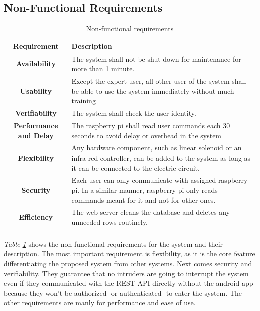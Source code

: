 \documentclass[12pt]{paper}
\begin{document}
		\subsection{Non-Functional Requirements}
		\def\arraystretch{1.5}
		\begin{table}[H]
			\begin{center}
				\begin{tabularx}{\linewidth}{|c|X|}\hline
					\textbf{Requirement} & \textbf{Description}\\\hline
					\textbf{Availability} & The system shall not be shut down for maintenance for more than 1 minute. \\\hline
					\textbf{Usability} & Except the expert user, all other user of the system shall be able to use the system immediately without much training  \\\hline
					\textbf{Verifiability} & The system shall check the user identity. \\\hline
					\textbf{Performance and Delay} & The raspberry pi shall read user commands each 30 seconds to avoid delay or overhead in the system\\\hline
					\textbf{Flexibility} & Any hardware component, such as linear solenoid or an infra-red controller, can be added to the system as long as it can be connected to the electric circuit.  \\\hline
					\textbf{Security} & Each user can only communicate with assigned raspberry pi. In a similar manner, raspberry pi only reads commands meant for it and not for other ones.  \\\hline
					\textbf{Efficiency} & The web server cleans the database and deletes any unneeded rows routinely.  \\\hline
				\end{tabularx}
			\end{center}
			\caption{Non-functional requirements}
			\label{table:non-func}
		\end{table}
		\paragraph{} \textit{Table \ref{table:non-func}} shows the non-functional requirements for the system and their description. The most important requirement is flexibility, as it is the core feature differentiating the proposed system from other systems. Next comes security and verifiability. They guarantee that no intruders are going to interrupt the system even if they communicated with the REST API directly without the android app because they won't be authorized -or authenticated- to enter the system. The other requirements are manly for performance and ease of use. 
		
\end{document}

